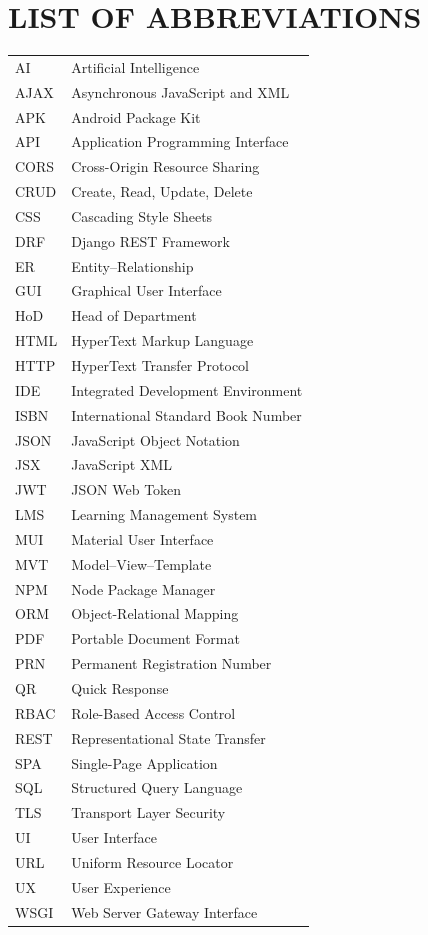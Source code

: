 \newpage
\section*{LIST OF ABBREVIATIONS}
\hline
\vspace{0.5cm}

\begin{longtable}{l l}
AI & Artificial Intelligence\\
AJAX & Asynchronous JavaScript and XML\\
APK & Android Package Kit\\
API & Application Programming Interface\\
CORS & Cross-Origin Resource Sharing\\
CRUD & Create, Read, Update, Delete\\
CSS & Cascading Style Sheets\\
DRF & Django REST Framework\\
ER & Entity--Relationship\\
GUI & Graphical User Interface\\
HoD & Head of Department\\
HTML & HyperText Markup Language\\
HTTP & HyperText Transfer Protocol\\
IDE & Integrated Development Environment\\
ISBN & International Standard Book Number\\
JSON & JavaScript Object Notation\\
JSX & JavaScript XML\\
JWT & JSON Web Token\\
LMS & Learning Management System\\
MUI & Material User Interface\\
MVT & Model--View--Template\\
NPM & Node Package Manager\\
ORM & Object-Relational Mapping\\
PDF & Portable Document Format\\
PRN & Permanent Registration Number\\
QR & Quick Response\\
RBAC & Role-Based Access Control\\
REST & Representational State Transfer\\
SPA & Single-Page Application\\
SQL & Structured Query Language\\
TLS & Transport Layer Security\\
UI & User Interface\\
URL & Uniform Resource Locator\\
UX & User Experience\\
WSGI & Web Server Gateway Interface\\
\end{longtable}